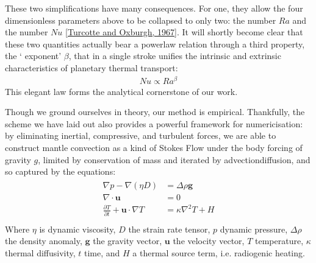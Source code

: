 \documentclass[letterpaper,10pt,english]{jupyterBook}
\begin{document}
\sphinxAtStartPar
These two simplifications have many consequences. For one, they allow the four dimensionless parameters above to be collapsed to only two: the  number \(Ra\) and the  number \(Nu\) {[}\hyperlink{cite.references:id818}{Turcotte and Oxburgh, 1967}{]}. It will shortly become clear that these two quantities actually bear a power\sphinxhyphen{}law relation through a third property, the ‘ exponent’ \(\beta\), that in a single stroke unifies the intrinsic and extrinsic characteristics of planetary thermal transport:
\begin{equation*}
\begin{split} Nu \propto Ra^{\beta}\end{split}
\end{equation*}
\sphinxAtStartPar
This elegant law forms the analytical cornerstone of our work.

\sphinxAtStartPar
Though we ground ourselves in theory, our method is empirical. Thankfully, the scheme we have laid out also provides a powerful framework for numericisation: by eliminating inertial, compressive, and turbulent forces, we are able to construct mantle convection as a kind of Stokes Flow under the body forcing of gravity \(g\), limited by conservation of mass and iterated by advection\sphinxhyphen{}diffusion, and so captured by the equations:
\begin{equation*}
\begin{split} \begin{align*}
\nabla p - \nabla \left( \eta D \right) &= \Delta \rho \mathbf{g} \\
\nabla \cdot \mathbf{u} &= 0 \\
\frac{\partial T}{\partial t} + \mathbf{u} \cdot \nabla T &= \kappa \nabla^2 T + H \\
\end{align*} \end{split}
\end{equation*}
\sphinxAtStartPar
Where \(\eta\) is dynamic viscosity, \(D\) the strain rate tensor, \(p\) dynamic pressure, \(\Delta\rho\) the density anomaly, \(\mathbf{g}\) the gravity vector, \(\mathbf{u}\) the velocity vector, \(T\) temperature, \(\kappa\) thermal diffusivity, \(t\) time, and \(H\) a thermal source term, i.e. radiogenic heating.
\end{document}
